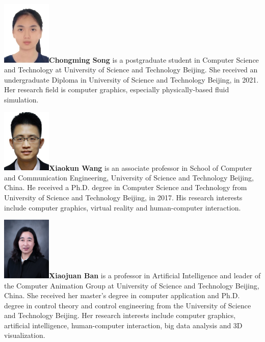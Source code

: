 \documentclass[VANCOUVER,STIX1COL]{WileyNJD-v2}
\begin{document}
\vspace{7ex}

\begin{biography}{\includegraphics[width=66pt,height=86pt]{VANCOUVER/figure/photos/ChongmingSong.JPG}}{\textbf{Chongming Song} is a postgraduate student in Computer Science and Technology at University of Science and Technology Beijing. She received an undergraduate Diploma in University of Science and Technology Beijing, in 2021. Her research field is computer graphics, especially physically-based fluid simulation.}
\end{biography}

\vspace{7ex}

\begin{biography}{\includegraphics[width=66pt,height=86pt]{VANCOUVER/figure/photos/XiaokunWang.jpg}}{\textbf{Xiaokun Wang} is an associate professor in School of Computer and Communication Engineering, University of Science and Technology Beijing, China. He received a Ph.D. degree in Computer Science and Technology from University of Science and Technology Beijing, in 2017. His research interests include computer graphics, virtual reality and human-computer interaction.}
\end{biography}

\vspace{4.15ex}

\begin{biography}{\includegraphics[width=66pt,height=86pt]{VANCOUVER/figure/photos/XiaojuanBan.png}}{\textbf{Xiaojuan Ban} is a professor in Artificial Intelligence and leader of the Computer Animation Group at University of Science and Technology Beijing, China. She received her master's degree in computer application and Ph.D. degree in control theory and control engineering from the University of Science and Technology Beijing. Her research interests include computer graphics, artificial intelligence, human-computer interaction, big data analysis and 3D visualization.}
\end{biography}
\end{document}

